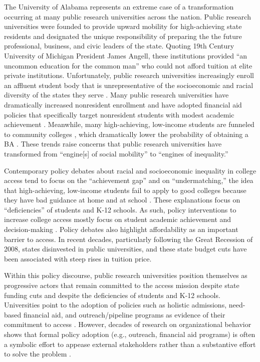 \documentclass[twoside]{article}
\begin{document}
The University of Alabama represents an extreme case of a transformation occurring at many public research universities across the nation.  Public research universities were founded to provide upward mobility for high-achieving state residents \citep{RN2269} and designated the unique responsibility of preparing the the future professional, business, and civic leaders of the state.  Quoting 19th Century University of Michigan President James Angell, these institutions provided ``an uncommon education for the common man'' \citep[as cited in][p. 279]{RN3608} who could not afford tuition at elite private institutions.  Unfortunately, public research universities increasingly enroll an affluent student body that is unrepresentative of the socioeconomic and racial diversity of the states they serve \citep{RN3685,RN4247,RN4438,RN4439}. Many public research universities have dramatically increased nonresident enrollment \citep{RN3753} and have adopted financial aid policies that specifically target nonresident students with modest academic achievement \citep{RN1469,RN3762,RN4032,RN4409}. Meanwhile, many high-achieving, low-income students are funneled to community colleges \citep{RN4429}, which dramatically lower the probability of obtaining a BA \citep{RN2261,RN4404}. These trends raise concerns that public research universities have transformed from ``engine[s] of social mobility'' \citep[][p. 3]{RN1149} to ``engines of inequality.''

Contemporary policy debates about racial and socioeconomic inequality in college access tend to focus on the ``achievement gap'' and on ``undermatching,'' the idea that high-achieving, low-income students fail to apply to good colleges because they have bad guidance at home and at school \citep{RN4016}.  These explanations focus on ``deficiencies'' of students and K-12 schools. As such, policy interventions to increase college access mostly focus on student academic achievement and decision-making \citep{RN4351}. Policy debates also highlight affordability as an important barrier to access. In recent decades, particularly following the Great Recession of 2008, states disinvested in public universities, and these state budget cuts have been associated with steep rises in tuition price.

Within this policy discourse, public research universities position themselves as progressive actors that remain committed to the access mission despite state funding cuts and despite the deficiencies of students and K-12 schools. Universities point to the adoption of policies such as holistic admissions, need-based financial aid, and outreach/pipeline programs as evidence of their commitment to access \citep{RN4017}.  However, decades of research on organizational behavior shows that formal policy adoption (e.g., outreach, financial aid programs) is often a symbolic effort to appease external stakeholders rather than a substantive effort to solve the problem \citep{RN2436}.
\end{document}
